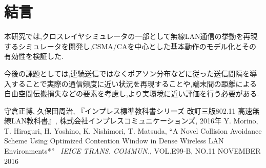 \documentclass[a4paper, 10pt]{ltjsarticle}
\begin{document}
\section{結言}
本研究では,クロスレイヤシミュレータの一部として無線LAN通信の挙動を再現するシミュレータを開発し,CSMA/CAを中心とした基本動作のモデル化とその有効性を検証した.

今後の課題としては,連続送信ではなくポアソン分布などに従った送信間隔を導入することで実際の通信頻度に近い状況を再現することや,端末間の距離による自由空間伝搬損失などの要素を考慮し,より実環境に近い評価を行う必要がある.




\begin{thebibliography}{9}
  守倉正博, 久保田周治, 『インプレス標準教科書シリーズ 改訂三版802.11 高速無線LAN教科書』, 株式会社インプレスコミュニケーションズ, 2016年
  Y. Morino, T. Hiraguri, H. Yoshino, K. Nishimori, T. Matsuda, ``A Novel Collision Avoidance Scheme Using Optimized Contention Window in Dense Wireless LAN Environments*'' \, \textit{IEICE TRANS. COMMUN.}, VOL.E99-B, NO.11 NOVEMBER 2016
\end{thebibliography}
\end{document}
